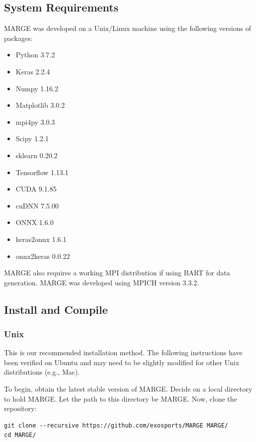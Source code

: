 \documentclass[letterpaper, 12pt]{article}
\begin{document}
\subsection{System Requirements}
\label{sec:requirements}

\noindent MARGE was developed on a Unix/Linux machine using the following 
versions of packages:

\begin{itemize}
\item Python 3.7.2
\item Keras 2.2.4
\item Numpy 1.16.2
\item Matplotlib 3.0.2
\item mpi4py 3.0.3
\item Scipy 1.2.1
\item sklearn 0.20.2
\item Tensorflow 1.13.1
\item CUDA 9.1.85
\item cuDNN 7.5.00
\item ONNX 1.6.0
\item keras2onnx 1.6.1
\item onnx2keras 0.0.22
\end{itemize}

\noindent MARGE also requires a working MPI distribution if using BART for 
data generation.  MARGE was developed using MPICH version 3.3.2.



\subsection{Install and Compile}
\label{sec:install}

\subsubsection{Unix}

\noindent This is our recommended installation method.  The following 
instructions have been verified on Ubuntu and may need to be slightly modified 
for other Unix distributions (e.g., Mac).

\noindent To begin, obtain the latest stable version of MARGE.  Decide on a 
local directory to hold MARGE.  Let the path to this directory be 
MARGE. Now, clone the repository:
\begin{verbatim}
git clone --recursive https://github.com/exosports/MARGE MARGE/
cd MARGE/
\end{verbatim}
\end{document}
